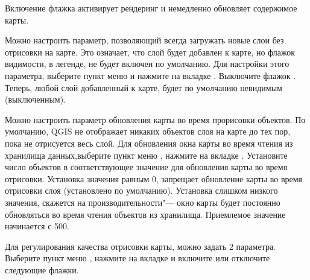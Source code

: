 Включение флажка  активирует рендеринг и немедленно
обновляет содержимое карты.

\label{label_settinglayer}

Можно настроить параметр, позволяющий всегда загружать новые слои без
отрисовки на карте. Это означает, что слой будет добавлен к карте, но
флажок видимости, в легенде, не будет включен по умолчанию. Для настройки
этого параметра, выберите пункт меню  \arrow
{} и нажмите на вкладке . Выключите
флажок . Теперь,
любой слой добавленный к карте, будет по умолчанию невидимым (выключенным).

%
%

\label{label_updatemap}

Можно настроить параметр обновления карты во время прорисовки объектов.
По умолчанию, QGIS не отображает никаких объектов слоя на карте до тех пор,
пока не отрисуется весь слой. Для обновления окна карты во время чтения
из хранилища данных,выберите пункт меню  \arrow
{}, нажмите на вкладке . Установите
число объектов в соответствующее значение для обновления карты во время
отрисовки. Установка значения равным 0, запрещает обновление карты во время
отрисовки слоя (установлено по умолчанию). Установка слишком низкого значения,
скажется на производительности"--- окно карты будет постоянно обновляться
во время чтения объектов из хранилища. Приемлемое значение начинается с 500.

\label{label_renderquality}

Для регулирования качества отрисовки карты, можно задать 2 параметра.
Выберите пункт меню  \arrow {},
нажмите на вкладке  и включите или отключите следующие флажки.

